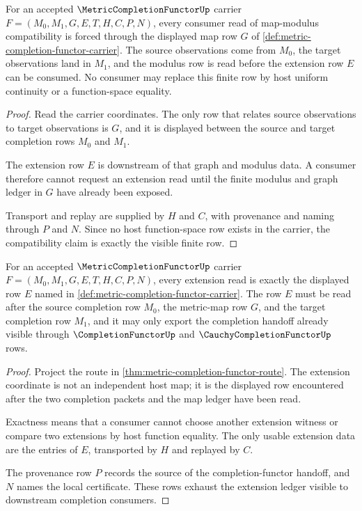 \begin{theorem}
\label{thm:metric-completion-functor-map-modulus-compatibility}
For an accepted $\MetricCompletionFunctorUp$ carrier
$F=(M_0,M_1,G,E,T,H,C,P,N)$, every consumer read of map-modulus compatibility
is forced through the displayed map row $G$ of
\autoref{def:metric-completion-functor-carrier}. The source observations
come from $M_0$, the target observations land in $M_1$, and the modulus row is
read before the extension row $E$ can be consumed. No consumer may replace
this finite row by host uniform continuity or a function-space equality.
\end{theorem}
\begin{proof}
Read the carrier coordinates. The only row that relates source observations
to target observations is $G$, and it is displayed between the source and
target completion rows $M_0$ and $M_1$.

The extension row $E$ is downstream of that graph and modulus data. A consumer
therefore cannot request an extension read until the finite modulus and graph
ledger in $G$ have already been exposed.

Transport and replay are supplied by $H$ and $C$, with provenance and naming
through $P$ and $N$. Since no host function-space row exists in the carrier,
the compatibility claim is exactly the visible finite row.
\end{proof}

\begin{theorem}
\label{thm:metric-completion-functor-extension-ledger-exactness}
For an accepted $\MetricCompletionFunctorUp$ carrier
$F=(M_0,M_1,G,E,T,H,C,P,N)$, every extension read is exactly the displayed
row $E$ named in \autoref{def:metric-completion-functor-carrier}. The row $E$
must be read after the source completion row $M_0$, the metric-map row $G$,
and the target completion row $M_1$, and it may only export the completion
handoff already visible through $\CompletionFunctorUp$ and
$\CauchyCompletionFunctorUp$ rows.
\end{theorem}
\begin{proof}
Project the route in \autoref{thm:metric-completion-functor-route}. The
extension coordinate is not an independent host map; it is the displayed row
encountered after the two completion packets and the map ledger have been
read.

Exactness means that a consumer cannot choose another extension witness or
compare two extensions by host function equality. The only usable extension
data are the entries of $E$, transported by $H$ and replayed by $C$.

The provenance row $P$ records the source of the completion-functor handoff,
and $N$ names the local certificate. These rows exhaust the extension ledger
visible to downstream completion consumers.
\end{proof}

